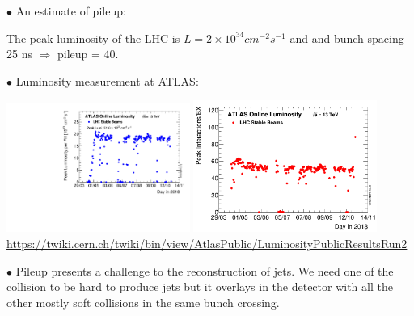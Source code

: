 \documentclass[9pt,a4paper,unknownkeysallowed,xcolor=dvipsnames,aspectratio=43]{beamer}
\begin{document}
\begin{frame}
\vspace{2mm}

{\color{darkred}\Large$\bullet$} An estimate of pileup:\\\vspace{2mm}

The peak luminosity of the LHC is $L=2\times10^{34} cm^{-2} s^{-1}$ and 
     and bunch spacing  25 ns $\Rightarrow$ pileup = 40.\\\vspace{2mm}
     
{\color{darkred}\Large$\bullet$} Luminosity measurement at ATLAS:
\begin{center}
    \includegraphics[width=0.45\textwidth]{01/peakLumi.pdf}
    \includegraphics[width=0.45\textwidth]{01/pileupATLAS.png}\\\vspace{1mm}
    {\tiny\href{https://twiki.cern.ch/twiki/bin/view/AtlasPublic/LuminosityPublicResultsRun2}{https://twiki.cern.ch/twiki/bin/view/AtlasPublic/LuminosityPublicResultsRun2}}
\end{center}
\vspace{2mm}

{\color{darkred}\Large$\bullet$} Pileup presents a challenge to the reconstruction of jets. We need one of the collision to be hard to produce jets but it overlays in the detector with all the other mostly soft collisions in the same bunch crossing.

\end{frame}
%
%
\end{document}
